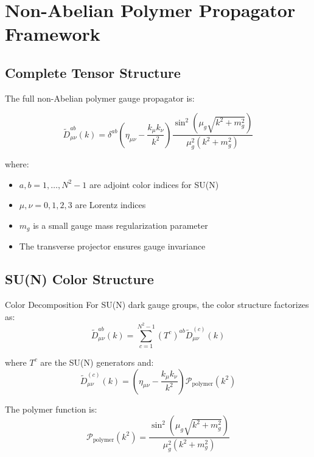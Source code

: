 \documentclass[12pt]{article}
\begin{document}
\section{Non-Abelian Polymer Propagator Framework}

\subsection{Complete Tensor Structure}

The full non-Abelian polymer gauge propagator is:

\begin{equation}
\tilde{D}^{ab}_{\mu\nu}(k) = \delta^{ab} \left( \eta_{\mu\nu} - \frac{k_\mu k_\nu}{k^2} \right) \frac{\sin^2(\mu_g \sqrt{k^2 + m_g^2})}{\mu_g^2 (k^2 + m_g^2)}
\end{equation}

where:
\begin{itemize}
\item $a,b = 1,\ldots,N^2-1$ are adjoint color indices for SU(N)
\item $\mu,\nu = 0,1,2,3$ are Lorentz indices  
\item $m_g$ is a small gauge mass regularization parameter
\item The transverse projector ensures gauge invariance
\end{itemize}

\subsection{SU(N) Color Structure}

\begin{physicsbox}{Color Decomposition}
For SU(N) dark gauge groups, the color structure factorizes as:
\begin{equation}
\tilde{D}^{ab}_{\mu\nu}(k) = \sum_{c=1}^{N^2-1} (T^c)^{ab} \tilde{D}^{(c)}_{\mu\nu}(k)
\end{equation}

where $T^c$ are the SU(N) generators and:
\begin{equation}
\tilde{D}^{(c)}_{\mu\nu}(k) = \left( \eta_{\mu\nu} - \frac{k_\mu k_\nu}{k^2} \right) \mathcal{P}_{\text{polymer}}(k^2)
\end{equation}

The polymer function is:
\begin{equation}
\mathcal{P}_{\text{polymer}}(k^2) = \frac{\sin^2(\mu_g \sqrt{k^2 + m_g^2})}{\mu_g^2 (k^2 + m_g^2)}
\end{equation}
\end{physicsbox}
\end{document}
